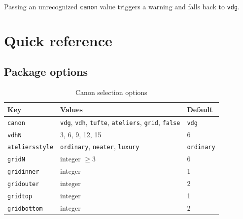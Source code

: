 \documentclass[11pt, twoside, openany]{book}
\begin{document}
Passing an unrecognized \texttt{canon} value triggers a warning and falls back to \texttt{vdg}.


\chapter{Quick reference}\label{chapter:quickreference}

\section{Package options}\label{sec:options}


\begin{table}[h]
	\caption{Canon selection options}
	\label{tab:cononselection}
	\centering
	\begin{tabular}{lll}
		\textbf{Key}        & \textbf{Values}  & \textbf{Default} \\
		\hline
		\texttt{canon}         & \texttt{vdg}, \texttt{vdh}, \texttt{tufte},
		\texttt{ateliers}, \texttt{grid}, \texttt{false}
		& \texttt{vdg} \\
		\texttt{vdhN}       & 3, 6, 9, 12, 15  & 6                \\
		\texttt{ateliersstyle} & \texttt{ordinary}, \texttt{neater}, \texttt{luxury}
		& \texttt{ordinary} \\
		\texttt{gridN}      & integer $\geq 3$ & 6                \\
		\texttt{gridinner}  & integer          & 1                \\
		\texttt{gridouter}  & integer          & 2                \\
		\texttt{gridtop}    & integer          & 1                \\
		\texttt{gridbottom} & integer          & 2                \\
	\end{tabular}
\end{table}
\end{document}
